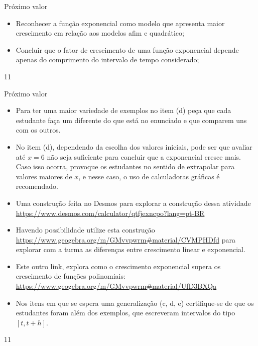 \def\currentcolor{session3}
\begin{objectives}{Próximo valor}
{
\begin{itemize}
\item Reconhecer a função exponencial como modelo que apresenta maior crescimento em relação aos modelos afim e quadrático;

\end{itemize}

\begin{itemize}
\item Concluir que o fator de crescimento de uma função exponencial depende apenas do comprimento do intervalo de tempo considerado;

\end{itemize}

}{1}{1}
\end{objectives}
\begin{sugestions}{Próximo valor}
{
\begin{itemize}
\item Para ter uma maior variedade de exemplos no item (d) peça que cada estudante faça um diferente do que está no enunciado e que comparem uns com os outros.

\item No item (d), dependendo da escolha dos valores iniciais, pode ser que avaliar até $x=6$ não seja suficiente para concluir que a exponencial cresce mais. Caso isso ocorra, provoque os estudantes no sentido de extrapolar para valores maiores de $x$, e nesse caso, o uso de calculadoras gráficas é recomendado.

\item Uma construção feita no Desmos para explorar a construção dessa atividade \url{https://www.desmos.com/calculator/qtfjexncpo?lang=pt-BR}

\item Havendo possibilidade utilize esta construção \url{https://www.geogebra.org/m/GMvvpwrm\#material/CVMPHDfd} para explorar com a turma  as diferenças entre crescimento linear e exponencial.

\item Este outro link, explora como o crescimento exponencial supera os crescimento de funções polinomiais:  \url{https://www.geogebra.org/m/GMvvpwrm\#material/UfD3BXQa}

\end{itemize}


\begin{itemize}
\item Nos itens em que se espera uma generalização (c, d, e) certifique-se de que os estudantes foram além dos exemplos, que escreveram intervalos do tipo $[t,t+h]$.

\end{itemize}
}{1}{1}
\end{sugestions}

